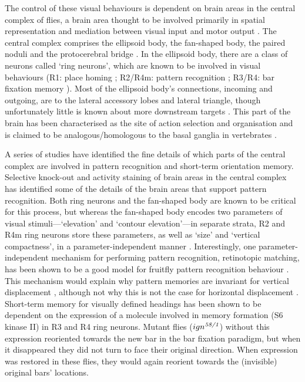 The control of these visual behaviours is dependent on brain areas in the central complex of flies, a brain area thought to be involved primarily in spatial representation and mediation between visual input and motor output \cite{Pfeiffer2014}.
The central complex comprises the ellipsoid body, the fan-shaped body, the paired noduli and the protocerebral bridge \cite{Young2010}.
In the ellipsoid body, there are a class of neurons called `ring neurons', which are known to be involved in visual behaviours (R1: place homing \cite{Ofstad2011,Sitaraman2010,Sitaraman2008}; R2/R4m: pattern recognition \cite{Pan2009,Liu2006,Ernst1999}; R3/R4: bar fixation memory \cite{Neuser2008}).
Most of the ellipsoid body's connections, incoming and outgoing, are to the lateral accessory lobes and lateral triangle, though unfortunately little is known about more downstream targets \cite{Pfeiffer2014,Young2010}.
This part of the brain has been characterised as the site of action selection and organisation and is claimed to be analogous/homologous to the basal ganglia in vertebrates \cite{Strausfeld2013}.

A series of studies have identified the fine details of which parts of the central complex are involved in pattern recognition and short-term orientation memory.
Selective knock-out and activity staining of brain areas in the central complex has identified some of the details of the brain areas that support pattern recognition.
Both ring neurons and the fan-shaped body are known to be critical for this process, but whereas the fan-shaped body encodes two parameters of visual stimuli---`elevation' and `contour elevation'---in separate strata, R2 and R4m ring neurons store these parameters, as well as `size' and `vertical compactness', in a parameter-independent manner \cite{Pan2009}.
Interestingly, one parameter-independent mechanism for performing pattern recognition, retinotopic matching, has been shown to be a good model for fruitfly pattern recognition behaviour \cite{Dill1993}.
This mechanism would explain why pattern memories are invariant for vertical displacement \cite{Dill1993}, although not why this is not the case for horizontal displacement \cite{Tang2004}.
Short-term memory for visually defined headings has been shown to be dependent on the expression of a molecule involved in memory formation (S6 kinase II) in R3 and R4 ring neurons.
Mutant flies ($ign^{\emph{58/1}}$) without this expression reoriented towards the new bar in the bar fixation paradigm, but when it disappeared they did not turn to face their original direction.
When expression was restored in these flies, they would again reorient towards the (invisible) original bars' locations.

